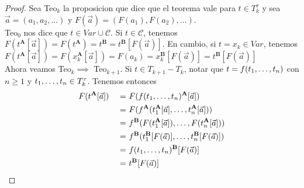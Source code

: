 \begin{proof}
  Sea Teo$_k$ la proposicion que dice que el teorema vale para $t\in T_k^\tau$ y sea $\vec{a} = (a_1, a_2, \dots)$ y $F(\vec{a}) = (F(a_1), F(a_2), \dots)$.\\
  Teo$_0$ nos dice que $t\in Var \cup \mathcal{C}$. Si $t \in \mathcal{C}$, tenemos $F(t^\mathbf{A}[\vec{a}]) = F(t^\mathbf{A}) = t^\mathbf{B} = t^\mathbf{B}[F(\vec{a})]$. En cambio, si $t = x_k \in Var$, tenemos 
  $F(t^\mathbf{A}[\vec{a}]) = F(x_k^\mathbf{A}[\vec{a}]) = F(a_k) = x_k^\mathbf{B}[F(\vec{a})] = t^\mathbf{B}[F(\vec{a})]$\\
  Ahora veamos Teo$_k \implies$ Teo$_{k+1}$. Si $t \in T_{k+1} - T_k$, notar que $t = f(t_{1}, \dots, t_{n})$ con $n \geq 1$ y $t_{1}, \dots, t_{n} \in T_k^\tau$. Tenemos entonces
  \begin{alignat*}{5}
    &F(t^\mathbf{A}[\vec{a}]) &\ = &\ F(f(\succession{t}{1}{n})^\mathbf{A}[\vec{a}])\\
    &&\ = &\ F(f^\mathbf{A}(t_1^\mathbf{A}[\vec{a}], \dots, t_n^\mathbf{A}[\vec{a}]))\\
    &&\ = &\ f^\mathbf{B}(F(t_1^\mathbf{A}[\vec{a}]), \dots, F(t_n^\mathbf{A}[\vec{a}]))\\
    &&\ = &\ f^\mathbf{B}(t_1^\mathbf{B}[F(\vec{a})], \dots, t_n^\mathbf{B}[F(\vec{a})])\\
    &&\ = &\ f(\succession{t}{1}{n})^\mathbf{B}[F(\vec{a})]\\
    &&\ = &\ t^\mathbf{B}[F(\vec{a})]
  \end{alignat*}
\end{proof}

